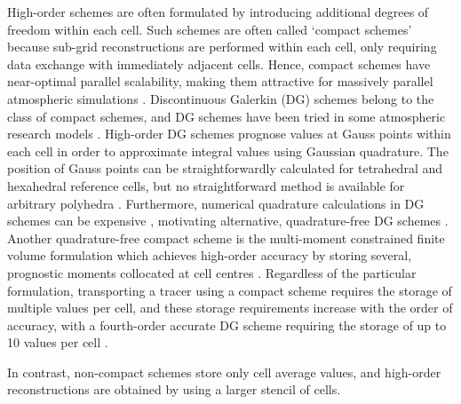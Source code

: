 High-order schemes are often formulated by introducing additional degrees of freedom within each cell.
Such schemes are often called `compact schemes' because sub-grid reconstructions are performed within each cell, only requiring data exchange with immediately adjacent cells.
Hence, compact schemes have near-optimal parallel scalability, making them attractive for massively parallel atmospheric simulations \citep{ullrich2014}.
Discontinuous Galerkin (DG) schemes belong to the class of compact schemes, and DG schemes have been tried in some atmospheric research models \citep{nair2005,giraldo-restelli2008}.
High-order DG schemes prognose values at Gauss points within each cell in order to approximate integral values using Gaussian quadrature.
The position of Gauss points can be straightforwardly calculated for tetrahedral and hexahedral reference cells, but no straightforward method is available for arbitrary polyhedra \citep{costa2017}.
Furthermore, numerical quadrature calculations in DG schemes can be expensive \citep{dumbser2007}, motivating alternative, quadrature-free DG schemes \citep{atkins-shu1998,nair2015}.
Another quadrature-free compact scheme is the multi-moment constrained finite volume formulation which achieves high-order accuracy by storing several, prognostic moments collocated at cell centres \citep{ii-xiao2009}.
Regardless of the particular formulation, transporting a tracer using a compact scheme requires the storage of multiple values per cell, and these storage requirements increase with the order of accuracy, with a fourth-order accurate DG scheme requiring the storage of up to 10 values per cell \citep{ullrich2010}.

In contrast, non-compact schemes store only cell average values, and high-order reconstructions are obtained by using a larger stencil of cells.

